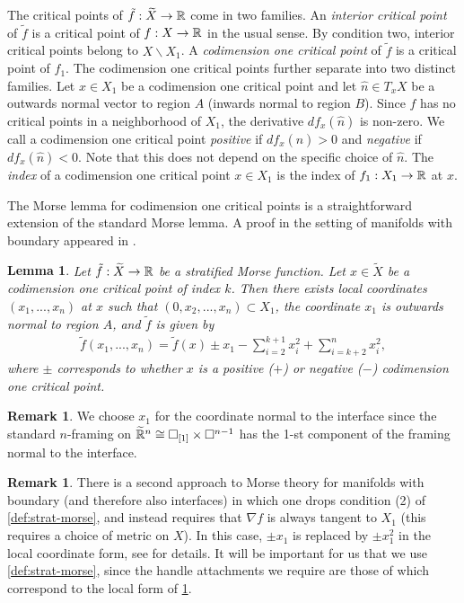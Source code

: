 \documentclass[10pt, reqno, twoside
, final
]{amsart}
\numberwithin{equation}{subsection}%
\theoremstyle{definition}
\theoremstyle{definition}
\theoremstyle{definition}
\theoremstyle{definition}
\theoremstyle{definition}
\theoremstyle{definition}
\theoremstyle{definition}
\theoremstyle{definition}
\theoremstyle{definition}
\theoremstyle{plain}
\theoremstyle{definition}
\theoremstyle{plain}
\theoremstyle{definition}
\theoremstyle{plain}
\theoremstyle{definition}
\newtheorem{rmk}[defn]{Remark}
\theoremstyle{definition}
\theoremstyle{plain}
\newtheorem{lem}[defn]{Lemma}
\theoremstyle{plain}
\theoremstyle{definition}
\theoremstyle{plain}
\theoremstyle{plain}
\theoremstyle{plain}
\begin{document}
The critical points of $\tilde{f}:\widetilde{X}\to \mathbb{R}$ come in two families. An \emph{interior critical point} of $\tilde{f}$ is a critical point of $f:X\to \mathbb{R}$ in the usual sense. By condition two, interior critical points belong to $X \backslash X_1$.  A \emph{codimension one critical point} of $\tilde{f}$ is a critical point of $f_1$. The codimension one critical points further separate into two distinct families. Let $x\in X_1$ be a codimension one critical point and let $\hat{n} \in T_xX$ be a outwards normal vector to region $A$ (inwards normal to region $B$). Since $f$ has no critical points in a neighborhood of $X_1$, the derivative $df_x(\hat{n})$ is non-zero. We call a codimension one critical point \emph{positive} if $df_x(\hat{n}) > 0$ and \emph{negative} if $df_x(\hat{n}) < 0$. Note that this does not depend on the specific choice of $\hat{n}$. The \emph{index} of a codimension one critical point $x\in X_1$ is the index of $f_1:X_1 \to \mathbb{R}$ at $x$.

The Morse lemma for codimension one critical points is a straightforward extension of the standard Morse lemma. A proof in the setting of manifolds with boundary appeared in \cite{JR72,Bra74}. 

\begin{lem}\label{lem:strat-Morse-lemma}
Let $\tilde{f}:\widetilde{X}\to \mathbb{R}$ be a stratified Morse function. Let $x\in \widetilde{X}$ be a codimension one critical point of index $k$. Then there exists local coordinates $(x_1,...,x_n)$ at $x$ such that $(0,x_{2},...,x_{n}) \subset X_1$, the coordinate $x_1$ is outwards normal to region $A$, and $\tilde{f}$ is given by
\begin{align*}
 \tilde{f}(x_1,...,x_n) = \tilde{f}(x) \pm x_1 - \sum_{i=2}^{k+1} x_i^2 + \sum_{i=k+2}^{n} x_i^2 ,
\end{align*}
where $\pm$ corresponds to whether $x$ is a positive ($+$) or negative ($-$) codimension one critical point.
\end{lem}

\begin{rmk}
We choose $x_1$ for the coordinate normal to the interface since the standard $n$-framing on $\widetilde{\mathbb{R}}^n \cong \square_{[1]} \times \square^{n-1}$ has the 1-st component of the framing normal to the interface.
\end{rmk}

\begin{rmk}
There is a second approach to Morse theory for manifolds with boundary (and therefore also interfaces) in which one drops condition (2) of \cref{def:strat-morse}, and instead requires that $\nabla f$ is always tangent to $X_1$ (this requires a choice of metric on $X$). In this case, $\pm x_1$ is replaced by $\pm x_1^2$ in the local coordinate form, see \cite{BNR} for details. It will be important for us that we use \cref{def:strat-morse}, since the handle attachments we require are those of \cite{GM} which correspond to the local form of \cref{lem:strat-Morse-lemma}.
\end{rmk}
\end{document}
